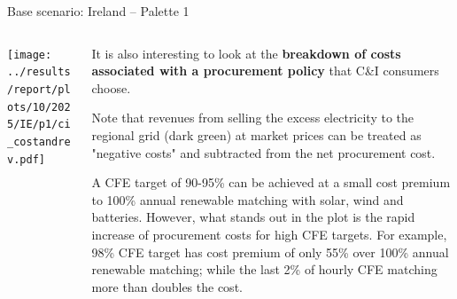 \begin{frame}{Base scenario: Ireland -- Palette 1}

    {\footnotesize
    \vspace{0.3cm}
    
    \begin{columns}[T]
    \begin{column}{9cm}
    \centering
    
    \texttt{[image: ../results/report/plots/10/2025/IE/p1/ci\_costandrev.pdf]}
    \end{column}
    \begin{column}{6cm}
    
    \vspace{0.1cm}
    It is also interesting to look at the {\bf breakdown of costs associated with
    a procurement policy} that C\&I consumers choose. 
    
    \vspace{0.3cm}
    Note that revenues from selling the excess electricity to the regional grid 
    (dark green) at market prices can be treated as "negative costs" and 
    subtracted from the net procurement cost.

    \vspace{0.3cm}
    A CFE target of 90-95\% can be achieved at a small cost premium to 100\% 
    annual renewable matching with solar, wind and batteries. However,
    what stands out in the plot is the rapid increase of procurement costs  
    for high CFE targets. For example, 98\% CFE target has 
    cost premium of only 55\% over 100\% annual renewable matching; while
    \alert{the last 2\% of hourly CFE matching more than doubles the 
    cost}.
  
    \end{column}
    \end{columns}
    }
    \end{frame}



